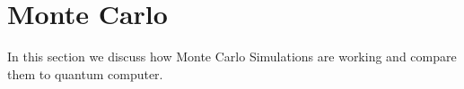 \documentclass[../main.tex]{subfiles}
\begin{document}
\section{Monte Carlo}\label{sec: mc}
In this section we discuss how Monte Carlo Simulations are working and compare them to quantum computer.
\biblio
\end{document}
